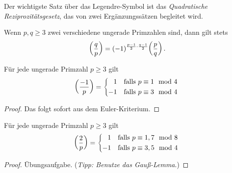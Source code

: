 Der wichtigste Satz über das Legendre-Symbol ist das \emph{Quadratische Reziprozitätsgesetz}, das von zwei Ergänzungssätzen begleitet wird.
\begin{satzmitnamen}
	Wenn $p,q\geqslant 3$ zwei verschiedene ungerade Primzahlen sind, dann gilt stets
	\begin{equation*}
		\parens*{\frac{q}{p}}=(-1)^{\frac{p-1}{2}\cdot \frac{q-1}{2}}\parens*{\frac{p}{q}}\,.
	\end{equation*}
\end{satzmitnamen}
\begin{satzmitnamen}
	Für jede ungerade Primzahl $p\geqslant 3$ gilt
	\begin{equation*}
		\parens*{\frac{-1}{p}}=\begin{cases*}
			\phantom{-}1 & falls $p\equiv 1\mod 4$\\
			-1 & falls $p\equiv 3\mod 4$
		\end{cases*}
	\end{equation*}
\end{satzmitnamen}
\begin{proof}
	Das folgt sofort aus dem Euler-Kriterium.
\end{proof}
\begin{satzmitnamen}
	Für jede ungerade Primzahl $p\geqslant 3$ gilt
	\begin{equation*}
		\parens*{\frac{2}{p}}=\begin{cases*}
			\phantom{-}1 & falls $p\equiv 1,7\mod 8$\\
			-1 & falls $p\equiv 3,5\mod 4$
		\end{cases*}
	\end{equation*}
\end{satzmitnamen}
\begin{proof}
	Übungsaufgabe. (\emph{Tipp: Benutze das Gauß-Lemma}.)
\end{proof}

